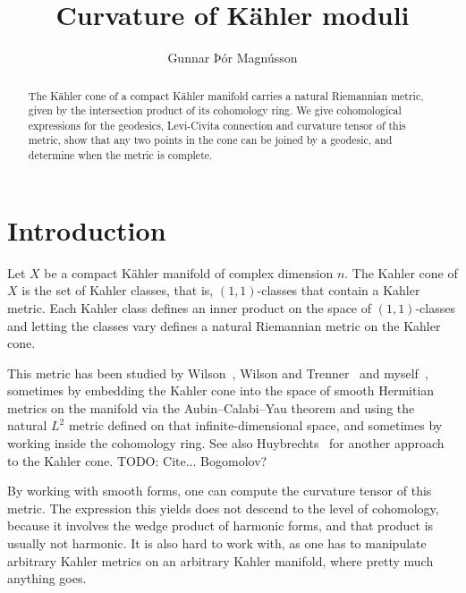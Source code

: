 \documentclass[11pt,a4paper]{amsart}
\title{Curvature of K\"{a}hler moduli}
\author{Gunnar Þór Magnússon}
\theoremstyle{definition}
\theoremstyle{remark}
\begin{document}
\begin{abstract}
The K\"{a}hler cone of a compact K\"ahler manifold carries a natural
Riemannian metric, given by the intersection product of its cohomology
ring. We give cohomological expressions for the geodesics, Levi-Civita
connection and curvature tensor of this metric, show that any two points
in the cone can be joined by a geodesic, and determine when the metric
is complete.
\end{abstract}

\maketitle



\section*{Introduction}

Let $X$ be a compact K\"{a}hler manifold of complex dimension $n$. The
Kahler cone of $X$ is the set of Kahler classes, that is,
$(1,1)$-classes that contain a Kahler metric. Each Kahler class defines
an inner product on the space of $(1,1)$-classes and letting the classes
vary defines a natural Riemannian metric on the Kahler cone. 

This metric has been studied by Wilson~\cite{Wilson}, Wilson and
Trenner~\cite{WilsonTrenner} and myself~\cite{Magnusson}, sometimes by
embedding the Kahler cone into the space of smooth Hermitian metrics on
the manifold via the Aubin--Calabi--Yau theorem and using the natural
$L^2$ metric defined on that infinite-dimensional space, and sometimes by working inside the cohomology ring. See also
Huybrechts~\cite{Huybrechts} for another approach to the Kahler
cone.
TODO: Cite... Bogomolov?

By working with smooth forms, one can compute the curvature tensor of this metric. The expression this yields does not descend to the level of cohomology, because it involves the wedge product of harmonic forms, and that product is usually not harmonic. It is also hard to work with, as one has to manipulate arbitrary Kahler metrics on an arbitrary Kahler manifold, where pretty much anything goes.
\end{document}
